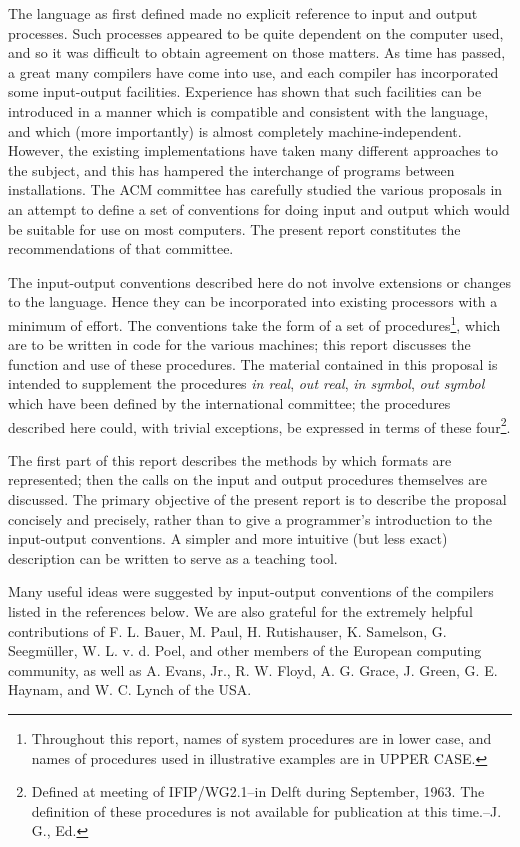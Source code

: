 \documentclass[a4paper,11pt]{article}
\begin{document}
The  language as first defined made no explicit reference to
input and output processes. Such processes appeared to be quite
dependent on the computer used, and so it was difficult to obtain
agreement on those matters. As time has passed, a great many \Algol
compilers have come into use, and each compiler has incorporated some
input-output facilities. Experience has shown that such facilities can
be introduced in a manner which is compatible and consistent with the
\Algol language, and which (more importantly) is almost completely
machine-independent. However, the existing implementations have taken
many different approaches to the subject, and this has hampered the
interchange of programs between installations. The ACM \Algol
committee has carefully studied the various proposals in an attempt to
define a set of conventions for doing input and output which would be
suitable for use on most computers.  The present report constitutes
the recommendations of that committee.

The input-output conventions described here do not involve extensions
or changes to the  language.  Hence they can be incorporated
into existing processors with a minimum of effort. The conventions
take the form of a set of procedures\footnote{Throughout this report,
names of system procedures are in lower case, and names of procedures
used in illustrative examples are in UPPER CASE.}, which are to be
written in code for the various machines; this report discusses the
function and use of these procedures. The material contained in this
proposal is intended to supplement the procedures {\it in real}, {\it
out real}, {\it in symbol}, {\it out symbol} which have been defined
by the international \Algol committee; the procedures described here
could, with trivial exceptions, be expressed in terms of these
four\footnote{Defined at meeting of IFIP/WG2.1--\Algol in Delft during
September, 1963. The definition of these procedures is not available
for publication at this time.--J. G., Ed.}.

The first part of this report describes the methods by which formats
are represented; then the calls on the input and output procedures
themselves are discussed. The primary objective of the present report
is to describe the proposal concisely and precisely, rather than to
give a programmer's introduction to the input-output conventions.  A
simpler and more intuitive (but less exact) description can be written
to serve as a teaching tool.

Many useful ideas were suggested by input-output conventions of the
compilers listed in the references below.  We are also grateful for
the extremely helpful contributions of F. L. Bauer, M. Paul,
H. Rutishauser, K. Samelson, G. Seegm\"uller, W. L. v. d. Poel, and
other members of the European computing community, as well as
A. Evans, Jr., R. W. Floyd, A. G. Grace, J. Green, G. E. Haynam, and
W. C. Lynch of the USA.
\end{document}
